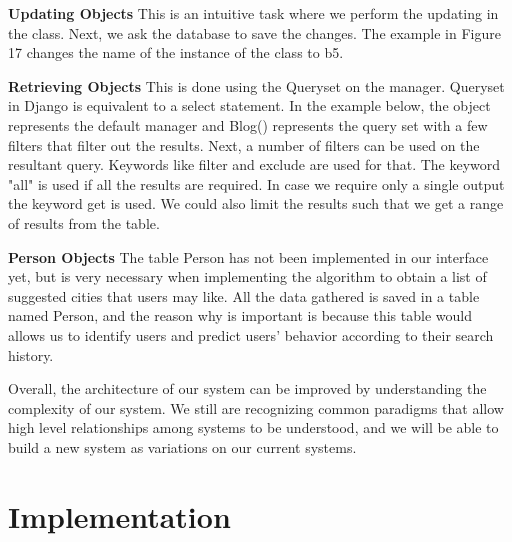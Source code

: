 \documentclass{sig-alternate}
\begin{document}
		\textbf{Updating Objects}\newline
		This is an intuitive task where we perform the updating in the class. Next, we ask the database 			to save the changes. The example in Figure 17 changes the name of the instance of the class to 			b5.\newline

		\textbf{Retrieving Objects}\newline
		This is done using the Queryset on the manager. Queryset in Django is equivalent to a select 				statement. In the example below, the object represents the default manager and Blog() represents 		the query set with a few filters that filter out the results. Next, a number of filters can be 			used on the resultant query. Keywords like filter and exclude are used for that. The keyword 				"all" is used if all the results are required. In case we require only a single output the 				keyword get is used. We could also limit the results such that we get a range of results from 			the table.\newline

		\textbf{Person Objects}\newline
		The table Person has not been implemented in our interface yet, but is very necessary when 				implementing the algorithm to obtain a list of suggested cities that users may like. All the 				data gathered is saved in a table named Person, and the reason why is important is because this 			table would allows us to identify users and predict users' behavior according to their search 			history.\newline

		Overall, the architecture of our system can be improved by understanding the complexity of our 			system. We still are recognizing common paradigms that allow high level relationships among 				systems to be understood, and we will be able to build a new system as variations on our 					current systems.
		\vspace{-4mm} 
			
\section{Implementation}
	\label{implementation}
\end{document}
